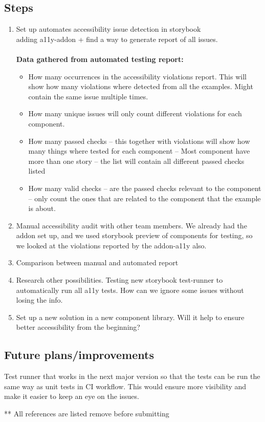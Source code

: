 \documentclass{master_thesis}
\begin{document}
\subsection{Steps}
\begin{enumerate}
	\item Set up automates accessibility issue detection in storybook \\
	adding a11y-addon + find a way to generate report of all issues. \\ \\
	\textbf{Data gathered from automated testing report:}
	\begin{itemize}
		\item How many occurrences in the accessibility violations report. This will show how many violations where detected from all the examples. Might contain the same issue multiple times.
		\item How many unique issues will only count different violations for each component.
		\item How many passed checks – this together with violations will show how many things where tested for each component – Most component have more than one story – the list will contain all different passed checks listed
		\item How many valid checks – are the passed checks relevant to the component – only count the ones that are related to the component that the example is about.
	\end{itemize}
	\item Manual accessibility audit with other team members. We already had the addon set up, and we used storybook preview of components for testing, so we looked at the violations reported by the addon-a11y also.
	\item Comparison between manual and automated report
	\item Research other possibilities. Testing new storybook test-runner to automatically run all a11y tests. How can we ignore some issues without losing the info.
	\item Set up a new solution in a new component library. Will it help to ensure better accessibility from the beginning?
\end{enumerate}

\subsection{Future plans/improvements}
Test runner that works in the next major version so that the tests can be run the same way as unit tests in CI workflow. This would ensure more visibility and make it easier to keep an eye on the issues.


\pagebreak
** All references are listed remove before submitting
\nocite{*}
\printbibliography
\end{document}
